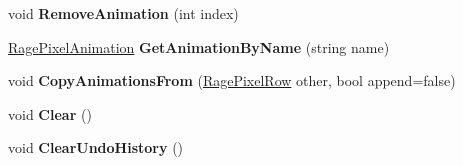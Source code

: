 \begin{DoxyCompactItemize}
\item 
\hypertarget{class_rage_pixel_row_acec66db2dded46a2863d851f6182baa7}{void {\bfseries Remove\-Animation} (int index)}\label{class_rage_pixel_row_acec66db2dded46a2863d851f6182baa7}

\item 
\hypertarget{class_rage_pixel_row_ae21e6d182ee5db23bc46354d13f79406}{\hyperlink{class_rage_pixel_animation}{Rage\-Pixel\-Animation} {\bfseries Get\-Animation\-By\-Name} (string name)}\label{class_rage_pixel_row_ae21e6d182ee5db23bc46354d13f79406}

\item 
\hypertarget{class_rage_pixel_row_ae54573881b7fdf7f15bc20709b7919a7}{void {\bfseries Copy\-Animations\-From} (\hyperlink{class_rage_pixel_row}{Rage\-Pixel\-Row} other, bool append=false)}\label{class_rage_pixel_row_ae54573881b7fdf7f15bc20709b7919a7}

\item 
\hypertarget{class_rage_pixel_row_a7a0dfa05da65f64f4ae4d6a4b4945df7}{void {\bfseries Clear} ()}\label{class_rage_pixel_row_a7a0dfa05da65f64f4ae4d6a4b4945df7}

\item 
\hypertarget{class_rage_pixel_row_a19cda7c1ac4398f77a11a458c5f79591}{void {\bfseries Clear\-Undo\-History} ()}\label{class_rage_pixel_row_a19cda7c1ac4398f77a11a458c5f79591}

\end{DoxyCompactItemize}
